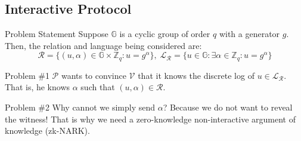 \documentclass[xcolor={usenames,dvipsnames}]{beamer}
\begin{document}
    \subsection{Interactive Protocol}
    \begin{frame}{Problem Statement}
        Suppose $\mathbb{G}$ is a cyclic group of order $q$ with a generator $g$. Then, the relation and language being considered are:
        \begin{equation*}
            \mathcal{R} = \{(u, \alpha) \in \mathbb{G} \times \mathbb{Z}_q: u = g^{\alpha}\}, \; \mathcal{L}_{\mathcal{R}} = \{u \in \mathbb{G}: \exists \alpha \in \mathbb{Z}_q: u = g^{\alpha}\}
        \end{equation*}

        \pause\begin{block}{Problem \#1}
            $\mathcal{P}$ wants to convince $\mathcal{V}$ that it knows the discrete log of $u \in \mathcal{L}_{\mathcal{R}}$. That is, he knows $\alpha$ such that $(u,\alpha) \in \mathcal{R}$.
        \end{block}

        \pause\begin{block}{Problem \#2}
            Why cannot we simply send $\alpha$? Because we do not want to reveal the witness! That is why we need a zero-knowledge non-interactive argument of knowledge (zk-NARK).
        \end{block}
    \end{frame}
\end{document}
